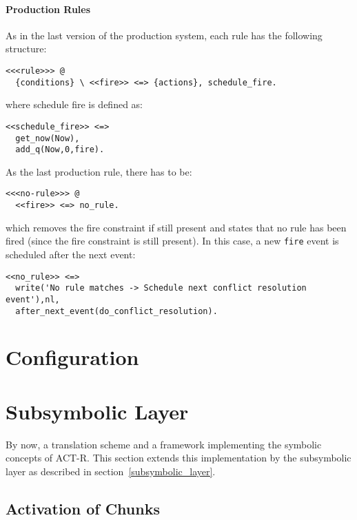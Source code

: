 \paragraph{Production Rules}

As in the last version of the production system, each rule has the following structure:

\begin{lstlisting}
<<<rule>>> @
  {conditions} \ <<fire>> <=> {actions}, schedule_fire.
\end{lstlisting}

where schedule fire is defined as:

\begin{lstlisting}
<<schedule_fire>> <=> 
  get_now(Now),
  add_q(Now,0,fire).
\end{lstlisting}

As the last production rule, there has to be:

\begin{lstlisting}
<<<no-rule>>> @ 
  <<fire>> <=> no_rule.
\end{lstlisting}

which removes the fire constraint if still present and states that no rule has been fired (since the fire constraint is still present). In this case, a new \verb|fire| event is scheduled after the next event:

\begin{lstlisting}
<<no_rule>> <=> 
  write('No rule matches -> Schedule next conflict resolution event'),nl,
  after_next_event(do_conflict_resolution).
\end{lstlisting}

\section{Configuration}
\label{configuration}


\section{Subsymbolic Layer}

By now, a translation scheme and a framework implementing the symbolic concepts of ACT-R. This section extends this implementation by the subsymbolic layer as described in section~\ref{subsymbolic_layer}.

\subsection{Activation of Chunks}

